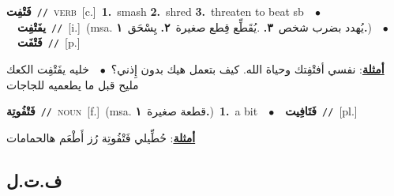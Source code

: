 \documentclass[10pt,a4paper,twoside]{article} %
\begin{document}
\begin{multicols}{2}
{{{{{{\setlength\topsep{0pt}\textbf{\foreignlanguage{arabic}{فَتْفِت}}\ {\color{gray}\texttt{//}\color{black}}\ \textsc{verb}\ [c.]\ \textbf{1.}~smash  \textbf{2.}~shred  \textbf{3.}~threaten to beat sb\ \ $\bullet$\ \ \setlength\topsep{0pt}\textbf{\foreignlanguage{arabic}{يفَتْفِت}}\ {\color{gray}\texttt{//}\color{black}}\ [i.]\ \color{gray}(msa. \foreignlanguage{arabic}{يُهدد بضرب شخص}~\foreignlanguage{arabic}{\textbf{٣.}}  .\foreignlanguage{arabic}{يُقَطِّع قِطع صغيرة}~\foreignlanguage{arabic}{\textbf{٢.}}  \foreignlanguage{arabic}{يِسْحَق}~\foreignlanguage{arabic}{\textbf{١.}})\color{black}\ \ $\bullet$\ \ \setlength\topsep{0pt}\textbf{\foreignlanguage{arabic}{فَتْفَت}}\ {\color{gray}\texttt{//}\color{black}}\ [p.]\  \begin{flushright}\color{gray}\foreignlanguage{arabic}{\textbf{\underline{\foreignlanguage{arabic}{أمثلة}}}: نفسي أفتْفِتك وحياة الله. كيف بتعمل هيك بدون إِذني؟\ $\bullet$\ \  خليه يفَتْفِت الكعك مليح قبل ما يطعميه للجاجات}\end{flushright}\color{black}} \vspace{2mm}

{\setlength\topsep{0pt}\textbf{\foreignlanguage{arabic}{فَتْفُوتِة}}\ {\color{gray}\texttt{//}\color{black}}\ \textsc{noun}\ [f.]\ \color{gray}(msa. \foreignlanguage{arabic}{قطعة صغيرة}~\foreignlanguage{arabic}{\textbf{١.}})\color{black}\ \textbf{1.}~a bit\ \ $\bullet$\ \ \setlength\topsep{0pt}\textbf{\foreignlanguage{arabic}{فَتَافِيت}}\ {\color{gray}\texttt{//}\color{black}}\ [pl.]\  \begin{flushright}\color{gray}\foreignlanguage{arabic}{\textbf{\underline{\foreignlanguage{arabic}{أمثلة}}}: حُطِّيلي فَتْفُوتِة رُز أَطْعَم هالحمامات}\end{flushright}\color{black}} \vspace{2mm}

\vspace{-3mm}
\subsection*{\color{blue}\foreignlanguage{arabic}{ف.ت.ل}\color{blue}{}} 

}}}}}
\end{multicols}
\end{document}
